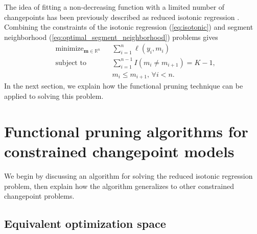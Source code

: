 \documentclass{article}
\DeclareMathOperator*{\minimize}{minimize}
\newcommand{\RR}{\mathbb R}
\begin{document}
The idea of fitting a non-decreasing function with a limited number of
changepoints has been previously described as reduced isotonic
regression \citep{reduced-monotonic-regression}. Combining the
constraints of the isotonic regression (\ref{eq:isotonic}) and segment
neighborhood (\ref{eq:optimal_segment_neighborhood}) problems gives
\begin{align}
  \label{eq:reduced}
  &\minimize_{\mathbf m\in\RR^n} && 
  \sum_{i=1}^n \ell(y_i, m_i)\\
  &\text{subject to} && \sum_{i=1}^{n-1} I(m_i \neq m_{i+1}) = K-1,
  \nonumber\\
  & && m_i \leq m_{i+1},\, \forall i<n.
  \nonumber 
\end{align}
In the next section, we explain how the functional pruning technique
can be applied to solving this problem.

\newcommand{\FCC}{C}
\newcommand{\M}{\mathcal{M}}
\section{Functional 
pruning algorithms for constrained
  changepoint models}
\label{sec:algorithms}



We begin by discussing an algorithm for solving the reduced isotonic
regression problem, then explain how the algorithm
generalizes to other constrained changepoint problems.

\subsection{Equivalent optimization space}
\end{document}
